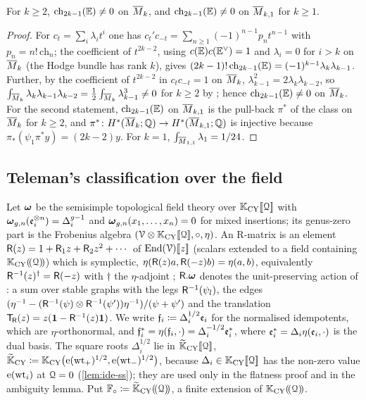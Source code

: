 \begin{lem}
\label{lem:ide-ch}
For $k\geq 2$, $\mathrm{ch}_{2k-1}(\mathbb{E})\neq 0$ on $\overline{M}_k$, and $\mathrm{ch}_{2k-1}(\mathbb{E})\neq 0$ on $\overline{M}_{k,1}$ for $k\geq 1$.
\end{lem}
\begin{proof}
For $c_t=\sum_i\lambda_it^i$ one has $c_t'c_{-t}=\sum_{n\geq 1}(-1)^{n-1}p_nt^{n-1}$ with $p_n=n!\,\mathrm{ch}_n$; the coefficient of $t^{2k-2}$, using $c(\mathbb{E})c(\mathbb{E}^\vee)=1$ and $\lambda_i=0$ for $i>k$ on $\overline{M}_k$ (the Hodge bundle has rank $k$), gives $(2k-1)!\,\mathrm{ch}_{2k-1}(\mathbb{E})=(-1)^{k-1}\lambda_k\lambda_{k-1}$. Further, by the coefficient of $t^{2k-2}$ in $c_tc_{-t}=1$ on $\overline{M}_k$, $\lambda_{k-1}^2=2\lambda_k\lambda_{k-2}$, so $\int_{\overline{M}_k}\lambda_k\lambda_{k-1}\lambda_{k-2}=\frac12\int_{\overline{M}_k}\lambda_{k-1}^3\neq 0$ for $k\geq 2$ by \cite[Theorem~4]{FP00}; hence $\mathrm{ch}_{2k-1}(\mathbb{E})\neq 0$ on $\overline{M}_k$. For the second statement, $\mathrm{ch}_{2k-1}(\mathbb{E})$ on $\overline{M}_{k,1}$ is the pull-back $\pi^*$ of the class on $\overline{M}_k$ for $k\geq 2$, and $\pi^*\colon H^*(\overline{M}_k;\mathbb{Q})\to H^*(\overline{M}_{k,1};\mathbb{Q})$ is injective because $\pi_*(\psi_1\pi^*y)=(2k-2)y$. For $k=1$, $\int_{\overline{M}_{1,1}}\lambda_1=1/24$.
\end{proof}

\subsection{Teleman's classification over the field}

Let $\boldsymbol{\omega}$ be the semisimple topological field theory over $\mathbb{K}_{\mathrm{CY}}[\![ \mathcal{Q} ]\!]$ with $\boldsymbol{\omega}_{g,n}(\mathfrak{e}_i^{\otimes n})=\Delta_i^{g-1}$ and $\boldsymbol{\omega}_{g,n}(x_1,\dots,x_n)=0$ for mixed insertions; its genus-zero part is the Frobenius algebra $(\mathcal{V}\otimes\mathbb{K}_{\mathrm{CY}}[\![ \mathcal{Q} ]\!],\circ,\eta)$. An R-matrix is an element $\mathsf{R}(z)=1+\mathsf{R}_1z+\mathsf{R}_2z^2+\cdots$ of $\operatorname{End}(\mathcal{V})[\![ z ]\!]$ (scalars extended to a field containing $\mathbb{K}_{\mathrm{CY}}(\!(\mathcal{Q})\!)$) which is symplectic, $\eta(\mathsf{R}(z)a,\mathsf{R}(-z)b)=\eta(a,b)$, equivalently $\mathsf{R}^{-1}(z)^\dagger=\mathsf{R}(-z)$ with $\dagger$ the $\eta$-adjoint \cite[(5)]{PPZ15}; $\mathsf{R}.\boldsymbol{\omega}$ denotes the unit-preserving action of \cite[Definitions~2.2, 2.13]{PPZ15}: a sum over stable graphs with the legs $\mathsf{R}^{-1}(\psi_l)$, the edges $(\eta^{-1}-(\mathsf{R}^{-1}(\psi)\otimes\mathsf{R}^{-1}(\psi'))\eta^{-1})/(\psi+\psi')$ and the translation $\mathsf{T}_{\!\mathsf{R}}(z)=z(\mathbf{1}-\mathsf{R}^{-1}(z)\mathbf{1})$. We write $\mathfrak{f}_i\coloneqq\Delta_i^{1/2}\mathfrak{e}_i$ for the normalised idempotents, which are $\eta$-orthonormal, and $\mathfrak{f}_i^*=\eta(\mathfrak{f}_i,\cdot)=\Delta_i^{-1/2}\mathfrak{e}_i^*$, where $\mathfrak{e}_i^*=\Delta_i\eta(\mathfrak{e}_i,\cdot)$ is the dual basis. The square roots $\Delta_i^{1/2}$ lie in $\widetilde{\mathbb{K}}_{\mathrm{CY}}[\![ \mathcal{Q} ]\!]$, $\widetilde{\mathbb{K}}_{\mathrm{CY}}\coloneqq\mathbb{K}_{\mathrm{CY}}\big(\mathrm{e}(\mathrm{wt}_+)^{1/2},\mathrm{e}(\mathrm{wt}_-)^{1/2}\big)$, because $\Delta_i\in\mathbb{K}_{\mathrm{CY}}[\![ \mathcal{Q} ]\!]$ has the non-zero value $\mathrm{e}(\mathrm{wt}_i)$ at $\mathcal{Q}=0$ (\cref{lem:ide-ss}); they are used only in the flatness proof and in the ambiguity lemma. Put $\mathbb{F}_{\circ}\coloneqq\widetilde{\mathbb{K}}_{\mathrm{CY}}(\!(\mathcal{Q})\!)$, a finite extension of $\mathbb{K}_{\mathrm{CY}}(\!(\mathcal{Q})\!)$.

